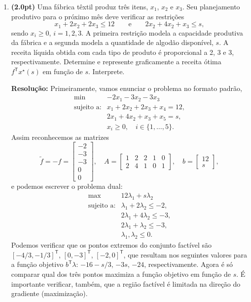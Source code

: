 \documentclass{article}
\newcommand{\T}{\mathsf{T}}
\begin{document}
\begin{enumerate}[resume*=exerc]
\item {\bf (2.0pt)} Uma fábrica têxtil produz três itens, $x_1$, $x_2$ e $x_3$. Seu planejamento produtivo para o próximo mês deve verificar as restrições
\[
x_1 + 2x_2 + 2x_3 \leq 12 \qquad \text{e} \qquad 2x_2 + 4x_2 + x_3 \leq s,
\]
sendo $x_i \geq 0$, $i = 1,2,3$. A primeira restrição modela a capacidade produtiva da fábrica e a segunda modela a quantidade de algodão disponível, $s$. A receita líquida obtida com cada tipo de produto é proporcional a 2, 3 e 3, respectivamente. Determine e represente graficamente a receita ótima $f^\T x^\star(s)$ em função de $s$. Interprete.
\begin{framed}
{\bf Resolução:}
   Primeiramente, vamos enunciar o problema no formato padrão,
    $$\begin{array}{rl}
    \min & -2x_1 - 3x_2 - 3x_3 \\
    \textrm{sujeito a:}
    & x_1 + 2x_2 + 2x_3 + x_4 = 12,\\
    & 2x_1 + 4x_2 + x_3 + x_5 = s,\\
    & x_i \geq 0,\quad i\in\{1,\dots,5\}.
    \end{array}$$
    Assim reconhecemos as matrizes
    \[    
    \tilde f = -f = \begin{bmatrix} -2\\ -3\\ -3\\ 0\\ 0 \end{bmatrix},\quad
    A = \begin{bmatrix} 1 & 2 & 2 & 1 & 0\\ 2 & 4 & 1 & 0 & 1 \end{bmatrix},\quad
    b = \begin{bmatrix} 12\\ s \end{bmatrix},
    \]
    e podemos escrever o problema dual:
    $$\begin{array}{rl}
    \max & 12\lambda_1 + s\lambda_2 \\
    \textrm{sujeito a:}
    & \lambda_1 + 2\lambda_2 \le -2,\\
    & 2\lambda_1 + 4\lambda_2 \le -3,\\
    & 2\lambda_1 + \lambda_2 \le -3,\\
    & \lambda_1,\lambda_2 \le 0.
    \end{array}$$
    Podemos verificar que os pontos extremos do conjunto factível são $[-4/3,-1/3]^\T$, $[0,-3]^\T$, $[-2,0]^\T$, que resultam nos seguintes valores para a função objetivo $b^\T\lambda$: $-16-s/3$, $-3s$, $-24$, respectivamente. Agora é só comparar qual dos três pontos maximiza a função objetivo em função de $s$. É importante verificar, também, que a região factível é limitada na direção do gradiente (maximização).
    

\end{framed}
\end{enumerate}
\end{document}
